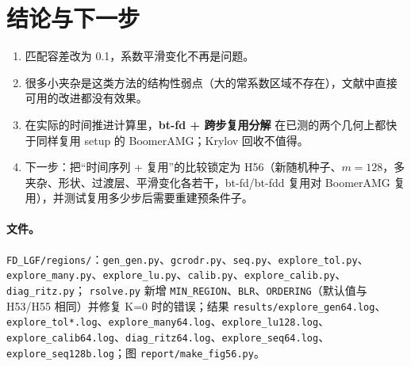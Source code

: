\documentclass[11pt,a4paper]{ctexart}
\begin{document}
\section{结论与下一步}
\begin{enumerate}
\item 匹配容差改为 0.1，系数平滑变化不再是问题。
\item 很多小夹杂是这类方法的结构性弱点（大的常系数区域不存在），文献中直接可用的改进都没有效果。
\item 在实际的时间推进计算里，\textbf{bt-fd + 跨步复用分解} 在已测的两个几何上都快于同样复用 setup 的 BoomerAMG；Krylov 回收不值得。
\item 下一步：把“时间序列 + 复用”的比较锁定为 H56（新随机种子、$m=128$，多夹杂、形状、过渡层、平滑变化各若干，bt-fd/bt-fdd 复用对 BoomerAMG 复用），并测试复用多少步后需要重建预条件子。
\end{enumerate}

\paragraph{文件。}\sloppy \texttt{FD\_LGF/regions/}：\texttt{gen\_gen.py}、\texttt{gcrodr.py}、\texttt{seq.py}、\texttt{explore\_tol.py}、\texttt{explore\_many.py}、\texttt{explore\_lu.py}、\texttt{calib.py}、\texttt{explore\_calib.py}、\texttt{diag\_ritz.py}；
\texttt{rsolve.py} 新增 \texttt{MIN\_REGION}、\texttt{BLR}、\texttt{ORDERING}（默认值与 H53/H55 相同）并修复 K=0 时的错误；结果 \texttt{results/explore\_gen64.log}、\texttt{explore\_tol*.log}、\texttt{explore\_many64.log}、\texttt{explore\_lu128.log}、\texttt{explore\_calib64.log}、\texttt{diag\_ritz64.log}、\texttt{explore\_seq64.log}、\texttt{explore\_seq128b.log}；图 \texttt{report/make\_fig56.py}。
\end{document}

